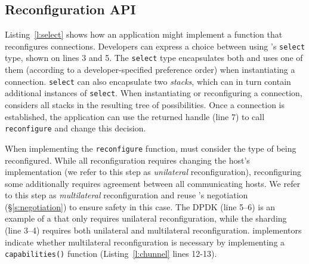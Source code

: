 \subsection{Reconfiguration API} 
Listing~\ref{l:select} shows how an application might implement a function that reconfigures connections.
Developers can express a choice between \tunnels using  \name's \texttt{select} type, shown on lines 3 and 5.
The \texttt{select} type encapsulates both \tunnels and uses one of them (according to a developer-specified preference order) when instantiating a connection.
\texttt{select} can also encapsulate two \tunnel \emph{stacks}, which can in turn contain additional instances of \texttt{select}. When instantiating or reconfiguring a connection, \name considers all stacks in the resulting tree of possibilities.
Once a connection is established, the application can use the returned handle (line 7) to call \texttt{reconfigure} and change this decision.

When implementing the \texttt{reconfigure} function, \name must consider the type of \tunnel being reconfigured. 
While all reconfiguration requires changing the host's \tunnel implementation (we refer to this step as \emph{unilateral} reconfiguration),
reconfiguring some \tunnels additionally requires agreement between all communicating hosts. 
We refer to this step as \emph{multilateral} reconfiguration and reuse \name's negotiation (\S\ref{s:negotiation}) to ensure safety in this case.
The DPDK \tunnel (line 5--6) is an example of a \tunnel that only requires unilateral reconfiguration, while the sharding \tunnel (line 3--4) requires both unilateral and multilateral reconfiguration.
\tunnel implementors indicate whether multilateral reconfiguration is necessary by implementing a \texttt{capabilities()} function (Listing~\ref{l:chunnel} lines 12-13). 

